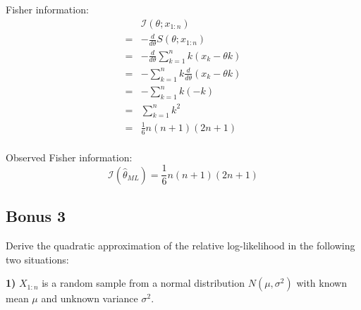 \documentclass{article}
\begin{document}
\begin{ssolution}
Fisher information:
\begin{align*}
	& \mathcal{I}(\theta;x_{1:n}) \\
	=& -\frac{d}{d\theta}S(\theta;x_{1:n}) \\
	=& -\frac{d}{d\theta}\sum_{k=1}^n k(x_k-\theta k) \\
	=& -\sum_{k=1}^n k\frac{d}{d\theta} (x_k-\theta k) \\
	=& -\sum_{k=1}^n k (-k) \\
	=& \sum_{k=1}^n k^2 \\
	=& \frac16n(n+1)(2n+1) \\
\end{align*}

Observed Fisher information:
\[\mathcal{I}(\hat{\theta}_{ML}) = \frac16n(n+1)(2n+1)\]
\end{ssolution}

\subsection{Bonus 3}

\begin{sproblem}
Derive the quadratic approximation of the relative log-likelihood in the following two situations:
\end{sproblem}

\begin{ssubproblem}
\textbf{1)} \(X_{1:n}\) is a random sample from a normal distribution \(N(\mu,
\sigma^2)\) with known mean \(\mu\) and unknown variance \(\sigma^2\).
\end{ssubproblem}
\end{document}
